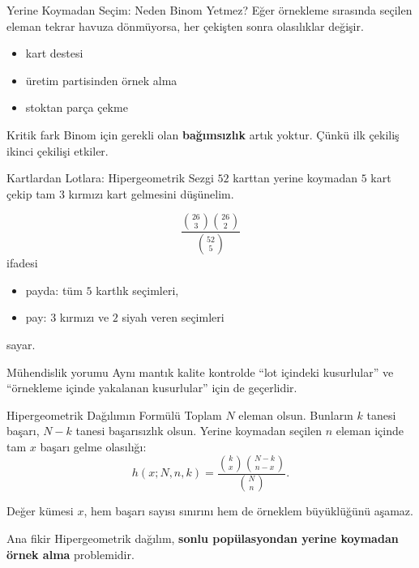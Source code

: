 \documentclass[light]{lutbeamer}
\begin{document}
\begin{frame}{Yerine Koymadan Seçim: Neden Binom Yetmez?}
    \small
    Eğer örnekleme sırasında seçilen eleman tekrar havuza dönmüyorsa, her çekişten sonra olasılıklar değişir.

    \begin{itemize}
        \item kart destesi
        \item üretim partisinden örnek alma
        \item stoktan parça çekme
    \end{itemize}

    \begin{alertblock}{Kritik fark}
        Binom için gerekli olan \textbf{bağımsızlık} artık yoktur. Çünkü ilk çekiliş ikinci çekilişi etkiler.
    \end{alertblock}
\end{frame}

\begin{frame}{Kartlardan Lotlara: Hipergeometrik Sezgi}
    \small
    \(52\) karttan yerine koymadan \(5\) kart çekip tam \(3\) kırmızı kart gelmesini düşünelim.

    \[
    \frac{\binom{26}{3}\binom{26}{2}}{\binom{52}{5}}
    \]
    ifadesi
    \begin{itemize}
        \item payda: tüm \(5\) kartlık seçimleri,
        \item pay: \(3\) kırmızı ve \(2\) siyah veren seçimleri
    \end{itemize}
    sayar.

    \begin{exampleblock}{Mühendislik yorumu}
        Aynı mantık kalite kontrolde ``lot içindeki kusurlular'' ve ``örnekleme içinde yakalanan kusurlular'' için de geçerlidir.
    \end{exampleblock}
\end{frame}

\begin{frame}{Hipergeometrik Dağılımın Formülü}
    \small
    Toplam \(N\) eleman olsun. Bunların \(k\) tanesi başarı, \(N-k\) tanesi başarısızlık olsun. Yerine koymadan seçilen \(n\) eleman içinde tam \(x\) başarı gelme olasılığı:
    \[
    h(x;N,n,k)=
    \frac{\binom{k}{x}\binom{N-k}{n-x}}{\binom{N}{n}}.
    \]

    \begin{block}{Değer kümesi}
        \(x\), hem başarı sayısı sınırını hem de örneklem büyüklüğünü aşamaz.
    \end{block}

    \begin{block}{Ana fikir}
        Hipergeometrik dağılım, \textbf{sonlu popülasyondan yerine koymadan örnek alma} problemidir.
    \end{block}
\end{frame}
\end{document}
